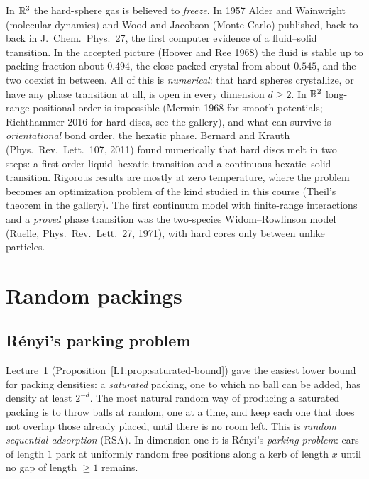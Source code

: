 In $\mathbb{R}^3$ the hard-sphere gas is believed to \emph{freeze}. In 1957 Alder and Wainwright (molecular
dynamics) and Wood and Jacobson (Monte Carlo) published, back to back in J.~Chem.\ Phys.~27, the
first computer evidence of a fluid--solid transition. In the accepted picture (Hoover and Ree 1968) the
fluid is stable up to packing fraction about $0.494$, the close-packed crystal from about $0.545$, and
the two coexist in between. All of this is \emph{numerical}: that hard spheres crystallize, or have any
phase transition at all, is open in every dimension $d\ge2$. In $\mathbb{R}^2$ long-range positional order is
impossible (Mermin 1968 for smooth potentials; Richthammer 2016 for hard discs, see the gallery), and
what can survive is \emph{orientational} bond order, the hexatic phase. Bernard and Krauth (Phys.\ Rev.\
Lett.\ 107, 2011) found numerically that hard discs melt in two steps: a first-order liquid--hexatic
transition and a continuous hexatic--solid transition. Rigorous results are mostly at zero temperature,
where the problem becomes an optimization problem of the kind studied in this course (Theil's theorem in
the gallery). The first continuum model with finite-range interactions and a \emph{proved} phase
transition was the two-species Widom--Rowlinson model (Ruelle, Phys.\ Rev.\ Lett.\ 27, 1971), with hard
cores only between unlike particles.

\section{Random packings}
\label{SM:sec:random}

\subsection{R\'enyi's parking problem}

Lecture~1 (Proposition~\ref{L1:prop:saturated-bound}) gave the easiest lower bound for packing
densities: a \emph{saturated} packing, one to which no ball can be added, has density at least
$2^{-d}$. The most natural random way of producing a saturated packing is to throw balls at random,
one at a time, and keep each one that does not overlap those already placed, until there is no room
left. This is \emph{random sequential adsorption} (RSA). In dimension one it is R\'enyi's \emph{parking
problem}: cars of length $1$ park at uniformly random free positions along a kerb of length $x$ until no
gap of length $\ge1$ remains.

